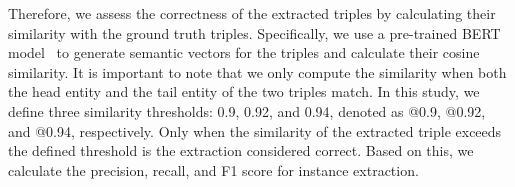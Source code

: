 Therefore, we assess the correctness of the extracted triples by calculating their similarity with the ground truth triples.
Specifically, we use a pre-trained BERT model~\cite{devlin2018bert} to generate semantic vectors for the triples and calculate their cosine similarity. It is important to note that we only compute the similarity when both the head entity and the tail entity of the two triples match.
In this study, we define three similarity thresholds: 0.9, 0.92, and 0.94, denoted as @0.9, @0.92, and @0.94, respectively.
Only when the similarity of the extracted triple exceeds the defined threshold is the extraction considered correct.
Based on this, we calculate the precision, recall, and F1 score for instance extraction.









